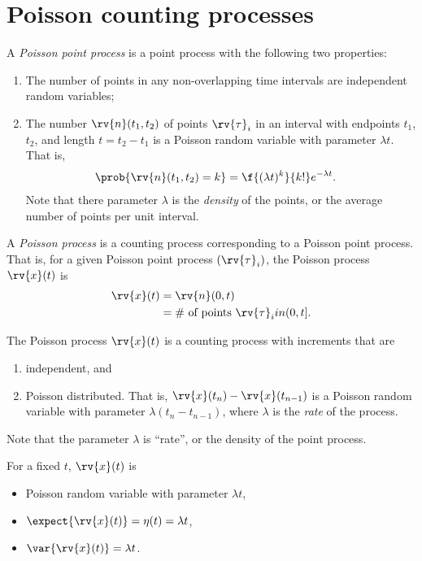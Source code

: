 \section{Poisson counting processes}
\begin{definitionBox}
    A \emph{Poisson point process} is a point process with the following two properties:
    \begin{enumerate}
        \item The number of points in any non-overlapping time intervals are independent random variables;
        \item The number $\rv{n}(t_{1}, t_{2})$ of points $\rv{\tau}_{i}$ in an interval with endpoints $t_{1}$, $t_{2}$, and length $t =t_{2}-t_{1}$ is a Poisson random variable with parameter $\lambda t$. That is,
        \begin{align}
            \prob{\rv{n}(t_{1}, t_{2}) = k} &= \f{(\lambda t)^{k}}{k!}e^{-\lambda t}.
        \end{align}
        Note that there parameter $\lambda$ is the \emph{density} of the points, or the average number of points per unit interval.
    \end{enumerate}
\end{definitionBox}

\begin{definitionBox}
    A \emph{Poisson process} is a counting process corresponding to a Poisson point process. That is, for a given Poisson point process $(\rv{\tau}_{i})$, the Poisson process $\rv{x}(t)$ is
    \begin{align}
        \rv{x}(t) &= \rv{n}(0, t) \\
        &= \text{\# of points } \rv{\tau}_{i} in (0, t].
    \end{align}    

    The Poisson process $\rv{x}(t)$ is a counting process with increments that are
    \begin{enumerate}
        \item independent, and
        \item Poisson distributed. That is, $\rv{x}(t_{n}) - \rv{x}(t_{n-1})$ is a Poisson random variable with parameter $\lambda (t_{n} - t_{n-1})$, where $\lambda$ is the \emph{rate} of the process.
    \end{enumerate}
\end{definitionBox}
\begin{remarkBox}
    Note that the parameter $\lambda$ is ``rate'', or the density of the point process. 
    
    For a fixed $t$, $\rv{x}(t)$ is
    \begin{itemize}
        \item Poisson random variable with parameter $\lambda t$,
        \item $\expect{\rv{x}(t)} = \eta(t) = \lambda t$,
        \item $\var{\rv{x}(t)} = \lambda t$.
    \end{itemize}
\end{remarkBox}



